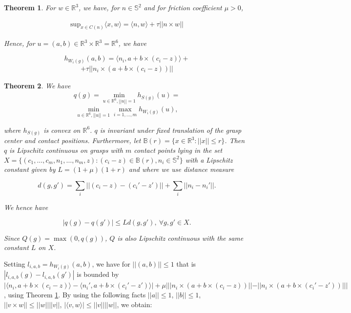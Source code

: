 \documentclass[letterpaper, 10 pt, conference]{ieeeconf}  %
\newtheorem{theorem}{Theorem}
\begin{document}
\begin{theorem}
\label{lemma35}
  \cite{pokorny2013classical}
For $w \in \mathbb{R}^3$, we have, for $n \in \mathbb{S}^2$ and for friction coefficient $\mu > 0$, 

\begin{align}
\mbox{sup}_{x \in C(n)} \langle x,w \rangle = \langle n,w \rangle + \tau||n \times w||
\end{align}

Hence, for $u = (a,b) \in \mathbb{R}^3 \times \mathbb{R}^3 = \mathbb{R}^6$, we have 

\[
h_{W_i(g)}(a,b) =
 \langle n_i,a+b\times(c_i-z)\rangle +
\]
\begin{align}
 +\tau ||n_i \times (a+b\times(c_i-z))||
\end{align}

\end{theorem}

\begin{theorem}
  \cite{pokorny2013classical}
We have \\

\begin{align}
q(g) 
=
\min_{u\in \mathbb{R}^6, ||u|| =1} h_{S(g)}(u) 
=
\end{align}
\[
\min_{u\in \mathbb{R}^6, ||u|| =1} \max_{i=1,...,m} h_{W_i(g)}(u),
\]

where $h_{S(g)}$ is convex on $\mathbb{R}^6$.
$q$ is invariant under fixed translation of the grasp center and contact positions.
Furthermore, let $\mathbb{B}(r) = \lbrace x \in \mathbb{R}^3 : ||x|| \leq r \rbrace$.
Then $q$ is Lipschitz continuous on grasps with $m$ contact points lying in the set $X = \lbrace (c_1, \dots, c_m,n_1, \dots,n_m,z) : (c_i-z) \in \mathbb{B}(r), n_i \in \mathbb{S}^2 \rbrace$ with a Lipschitz constant given by $L= (1+\mu)(1+r)$ and where we use distance measure 

\[
  d(g,g') = \sum_i ||(c_i-z)-(c_i'-z')|| + \sum_i ||n_i - n_i'||.
\]

We hence have 

\[
|q(g) - q(g')| \leq Ld(g,g'),\  \forall g,g' \in X.
\]

Since $Q(g) = \max(0,q(g))$, $Q$ is also Lipschitz continuous with the same constant $L$ on $X$. 
\end{theorem}

Setting $l_{i,a,b} = h_{W_i(g)}(a,b)$, we have for $||(a,b)|| \leq 1$ that is $|l_{i,a,b}(g) - l_{i,a,b}(g')|$ is bounded by $|\langle n_i,a+b\times (c_i-z)\rangle - \langle n_i',a+b\times(c_i'-z')\rangle|+\mu|||n_i \times (a+b \times (c_i -z))|| - ||n_i \times (a + b \times (c_i' - z')) |||$, using Theorem \ref{lemma35}.
By using the following facts $||a|| \leq 1$, $||b|| \leq 1$, $||v \times w || \leq ||w||||v||$, $|\langle v,w\rangle | \leq ||v||||w||$, we obtain:  
\end{document}
